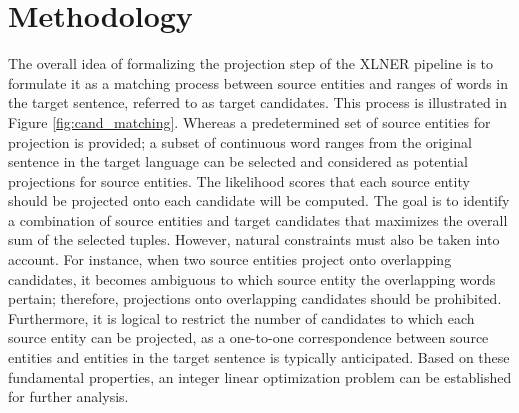 \chapter{Methodology}
\label{sec:methodology}
The overall idea of formalizing the projection step of the XLNER pipeline is
to formulate it as a matching process between source entities and ranges
of words in the target sentence, referred to as target candidates. This process is
illustrated in Figure \ref{fig:cand_matching}. Whereas a predetermined set of source entities
for projection is provided; a subset of continuous word ranges from the original
sentence in the target language can be selected and considered as potential
projections for source entities. The likelihood scores that each source entity
should be projected onto each candidate will be computed. The goal is to identify a
combination of source entities and target candidates that maximizes the overall
sum of the selected tuples. However, natural constraints must also be taken into account.
For instance, when two source entities project onto overlapping candidates, it becomes
ambiguous to which source entity the overlapping words pertain; therefore, projections
onto overlapping candidates should be prohibited. Furthermore, it is logical to
restrict the number of candidates to which each source entity can be projected,
as a one-to-one correspondence between source entities and entities in the
target sentence is typically anticipated. Based on these fundamental properties,
an integer linear optimization problem can be established for further analysis.

